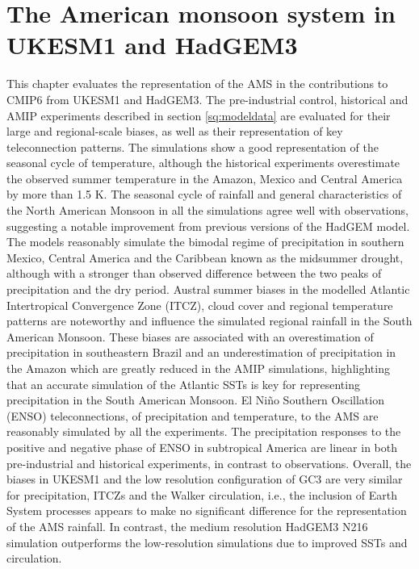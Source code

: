 \chapter{\label{ch:4-ams}The American monsoon system in UKESM1 and HadGEM3}


This chapter evaluates the representation of the AMS in the contributions to CMIP6 from UKESM1 and HadGEM3. The pre-industrial control, historical and AMIP experiments described in section \ref{sq:modeldata} are evaluated for their large and regional-scale biases, as well as their representation of key teleconnection patterns.
The simulations show a good representation of the seasonal cycle of temperature, although the historical experiments overestimate the observed summer temperature in the Amazon, Mexico and Central America by more than 1.5 K.
The seasonal cycle of rainfall and general characteristics of the North American Monsoon in all the simulations agree well with observations, suggesting  a notable improvement from previous versions of the HadGEM model.
 The models reasonably simulate the bimodal regime of precipitation in southern Mexico, Central America and the Caribbean known as the midsummer drought, although  with a stronger than observed difference between the two peaks of precipitation and the dry period. 
Austral summer biases in the modelled Atlantic Intertropical Convergence Zone (ITCZ), cloud cover and regional temperature patterns are noteworthy and influence the simulated regional rainfall in the South American Monsoon.
These biases are associated with an overestimation of precipitation in southeastern Brazil and an underestimation of precipitation in the Amazon which are greatly reduced in the AMIP simulations, highlighting that an accurate simulation of the Atlantic SSTs is key for representing precipitation in the South American Monsoon.  
  El Ni\~no Southern Oscillation (ENSO) teleconnections, of precipitation and temperature, to the AMS are reasonably simulated by all the experiments. 
The precipitation responses to the positive and negative phase of ENSO in subtropical America are linear in both pre-industrial and historical experiments, in contrast to observations.
  Overall, the biases in UKESM1 and the low resolution configuration of GC3 are very similar for precipitation, ITCZs and the Walker circulation, i.e., the inclusion of  Earth System processes appears to make no significant difference for the representation of the AMS rainfall. 
In contrast, the medium resolution HadGEM3 N216 simulation outperforms the low-resolution simulations due to improved SSTs and circulation.


